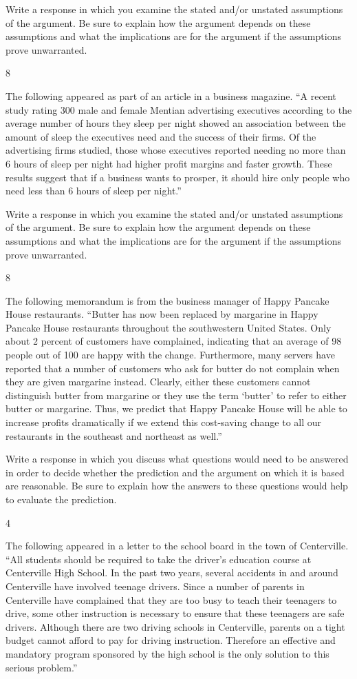 \documentclass[]{article}
\begin{document}
Write a response in which you examine the stated and/or unstated
assumptions of the argument. Be sure to explain how the argument depends
on these assumptions and what the implications are for the argument if
the assumptions prove unwarranted.

8

The following appeared as part of an article in a business magazine. ``A
recent study rating 300 male and female Mentian advertising executives
according to the average number of hours they sleep per night showed an
association between the amount of sleep the executives need and the
success of their firms. Of the advertising firms studied, those whose
executives reported needing no more than 6 hours of sleep per night had
higher profit margins and faster growth. These results suggest that if a
business wants to prosper, it should hire only people who need less than
6 hours of sleep per night.''

Write a response in which you examine the stated and/or unstated
assumptions of the argument. Be sure to explain how the argument depends
on these assumptions and what the implications are for the argument if
the assumptions prove unwarranted.

8

The following memorandum is from the business manager of Happy Pancake
House restaurants. ``Butter has now been replaced by margarine in Happy
Pancake House restaurants throughout the southwestern United States.
Only about 2 percent of customers have complained, indicating that an
average of 98 people out of 100 are happy with the change. Furthermore,
many servers have reported that a number of customers who ask for butter
do not complain when they are given margarine instead. Clearly, either
these customers cannot distinguish butter from margarine or they use the
term `butter' to refer to either butter or margarine. Thus, we predict
that Happy Pancake House will be able to increase profits dramatically
if we extend this cost-saving change to all our restaurants in the
southeast and northeast as well.''

Write a response in which you discuss what questions would need to be
answered in order to decide whether the prediction and the argument on
which it is based are reasonable. Be sure to explain how the answers to
these questions would help to evaluate the prediction.

4

The following appeared in a letter to the school board in the town of
Centerville. ``All students should be required to take the driver's
education course at Centerville High School. In the past two years,
several accidents in and around Centerville have involved teenage
drivers. Since a number of parents in Centerville have complained that
they are too busy to teach their teenagers to drive, some other
instruction is necessary to ensure that these teenagers are safe
drivers. Although there are two driving schools in Centerville, parents
on a tight budget cannot afford to pay for driving instruction.
Therefore an effective and mandatory program sponsored by the high
school is the only solution to this serious problem.''
\end{document}
